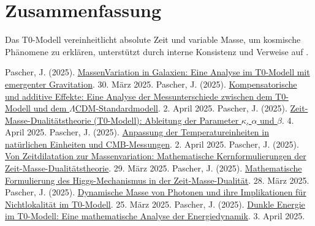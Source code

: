 \documentclass[a4paper,12pt]{article}
\theoremstyle{definition}
\theoremstyle{remark}
\begin{document}
	\section{Zusammenfassung}
	
	Das T0-Modell vereinheitlicht absolute Zeit und variable Masse, um kosmische Phänomene zu erklären, unterstützt durch interne Konsistenz und Verweise auf \cite{pascher_galaxies_2025, pascher_params_2025, pascher_messdifferenzen_2025}.
	
	\begin{thebibliography}{99}
		 Pascher, J. (2025). \href{https://github.com/jpascher/T0-Time-Mass-Duality/tree/main/2/pdf/Deutsch/MassVarGalaxien.pdf}{MassenVariation in Galaxien: Eine Analyse im T0-Modell mit emergenter Gravitation}. 30. März 2025.
		 Pascher, J. (2025). \href{https://github.com/jpascher/T0-Time-Mass-Duality/tree/main/2/pdf/Deutsch/MessdifferenzenT0Standard.pdf}{Kompensatorische und additive Effekte: Eine Analyse der Messunterschiede zwischen dem T0-Modell und dem \(\Lambda\)CDM-Standardmodell}. 2. April 2025.
		 Pascher, J. (2025). \href{https://github.com/jpascher/T0-Time-Mass-Duality/tree/main/2/pdf/Deutsch/ZeitMasseT0Params.pdf}{Zeit-Masse-Dualitätstheorie (T0-Modell): Ableitung der Parameter \(\kappa\), \(\alpha\) und \(\beta\)}. 4. April 2025.
		 Pascher, J. (2025). \href{https://github.com/jpascher/T0-Time-Mass-Duality/tree/main/2/pdf/Deutsch/NatEinheitenAlpha1.pdf}{Anpassung der Temperatureinheiten in natürlichen Einheiten und CMB-Messungen}. 2. April 2025.
		 Pascher, J. (2025). \href{https://github.com/jpascher/T0-Time-Mass-Duality/tree/main/2/pdf/Deutsch/MathZeitMasseLagrange.pdf}{Von Zeitdilatation zur Massenvariation: Mathematische Kernformulierungen der Zeit-Masse-Dualitätstheorie}. 29. März 2025.
		 Pascher, J. (2025). \href{https://github.com/jpascher/T0-Time-Mass-Duality/tree/main/2/pdf/Deutsch/MathHiggsZeitMasse.pdf}{Mathematische Formulierung des Higgs-Mechanismus in der Zeit-Masse-Dualität}. 28. März 2025.
		 Pascher, J. (2025). \href{https://github.com/jpascher/T0-Time-Mass-Duality/tree/main/2/pdf/Deutsch/DynMassePhotonenNichtlokal.pdf}{Dynamische Masse von Photonen und ihre Implikationen für Nichtlokalität im T0-Modell}. 25. März 2025.
		 Pascher, J. (2025). \href{https://github.com/jpascher/T0-Time-Mass-Duality/tree/main/2/pdf/Deutsch/MathEnergiedynamik.pdf}{Dunkle Energie im T0-Modell: Eine mathematische Analyse der Energiedynamik}. 3. April 2025.
	\end{thebibliography}
	
\end{document}
